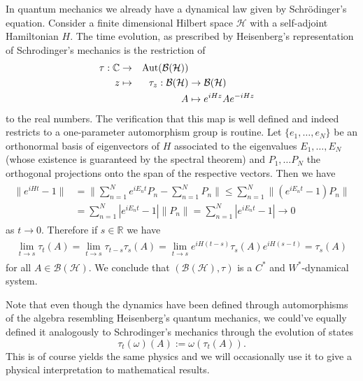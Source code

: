 \begin{example}\label{ex:schrodinger}
In quantum mechanics we already have a dynamical law given by Schrödinger's equation. Consider a finite dimensional Hilbert space $\mathcal{H}$ with a self-adjoint Hamiltonian $H$. The time evolution, as prescribed by Heisenberg's representation of Schrodinger's mechanics is the restriction of
\begin{alignat}{2}
\tau:\mathbb{C}&\rightarrow&\operatorname{Aut}(\mathcal{B}(\mathcal{H})) \nonumber \\
z&\mapsto&\tau_z:\mathcal{B}(\mathcal{H})&\rightarrow\mathcal{B}(\mathcal{H}) \\
&&A&\mapsto e^{iHz}Ae^{-iHz} \nonumber
\end{alignat}
to the real numbers. The verification that this map is well defined and indeed restricts to a one-parameter automorphism group is routine.
Let $\{e_1,\dots,e_N\}$ be an orthonormal basis of eigenvectors of $H$ associated to the eigenvalues $E_1,\dots,E_N$ (whose existence is guaranteed by the spectral theorem) and $P_1,\dots P_N$ the orthogonal projections onto the span of the respective vectors. Then we have
\begin{align}
\begin{split}
\|e^{iHt}-1\|&=\|\sum_{n=1}^Ne^{iE_nt}P_n-\sum_{n=1}^N P_n\|\leq\sum_{n=1}^N \|\left(e^{iE_nt}-1\right)P_n\| \\
&= \sum_{n=1}^N|e^{iE_nt}-1|\|P_n\|=\sum_{n=1}^N|e^{iE_nt}-1|\rightarrow 0
\end{split}
\end{align}
as $t\rightarrow 0$. Therefore if $s\in\mathbb{R}$ we have
\begin{align}
\begin{split}
\lim_{t\rightarrow s}\tau_t(A)=\lim_{t\rightarrow s}\tau_{t-s}\tau_s(A)=\lim_{t\rightarrow s}e^{iH(t-s)}\tau_s(A)e^{iH(s-t)}=\tau_s(A)
\end{split}
\end{align}
for all $A\in \mathcal{B}(\mathcal{H})$. We conclude that $(\mathcal{B}(\mathcal{H}),\tau)$ is a $C^*$ and $W^*$-dynamical system.
\end{example} 

Note that even though the dynamics have been defined through automorphisms of the algebra resembling Heisenberg's quantum mechanics, we could've equally defined it analogously to Schrodinger's mechanics through the evolution of states
\begin{equation}
\tau_t(\omega)(A):=\omega(\tau_t(A)).
\end{equation}
This is of course yields the same physics and we will occasionally use it to give a physical interpretation to mathematical results. 